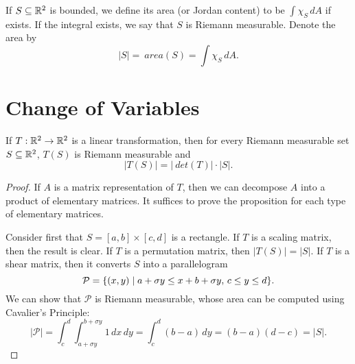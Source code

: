 \begin{df}
    If $S \subseteq {\mathbb R}^2$ is bounded, we define its area (or Jordan content) to be $\int \chi_S \, dA$ if exists. If the integral exists, we say that $S$ is Riemann measurable. Denote the area by
    \[
    |S| = ~area (S) = \int \chi_S \, dA.
    \]
\end{df}

\section{Change of Variables}

\begin{prop}
    If $T: {\mathbb R}^2 \to {\mathbb R}^2$ is a linear transformation, then for every Riemann measurable set $S \subseteq {\mathbb R}^2$, $T(S)$ is Riemann measurable and
    \[
    |T(S)| = |~det(T)| \cdot |S|.
    \]
    \begin{proof}
        If $A$ is a matrix representation of $T$, then we can decompose $A$ into a product of elementary matrices. It suffices to prove the proposition for each type of elementary matrices.

        Consider first that $S = [a, b] \times [c, d]$ is a rectangle. If $T$ is a scaling matrix, then the result is clear. If $T$ is a permutation matrix, then $|T(S)| = |S|$. If $T$ is a shear matrix, then it converts $S$ into a parallelogram
        \[
        \mathcal P = {\left\{{(x, y) \mid a + \sigma y \leq x + b + \sigma y,\, c \leq y \leq d}\right\}}.
        \]
        We can show that $\mathcal P$ is Riemann measurable, whose area can be computed using Cavalier's Principle:
        \[
        |\mathcal P| = \int_c^d \int_{a + \sigma y}^{b + \sigma y} 1 \, dx \, dy = \int_c^d (b - a) \, dy = (b - a)(d - c) = |S|.
        \]
        

\end{proof}
\end{prop}
